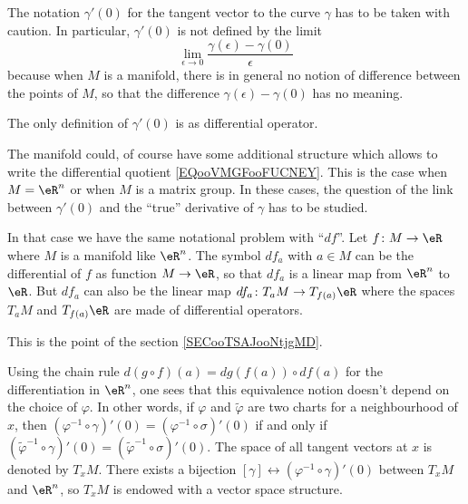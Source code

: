 \begin{remark}      \label{REMooJQFHooQuoZxt}
    The notation \( \gamma'(0)\) for the tangent vector to the curve \( \gamma\) has to be taken with caution. In particular, \( \gamma'(0)\) is not defined by the limit
    \begin{equation}        \label{EQooVMGFooFUCNEY}
        \lim_{\epsilon\to 0} \frac{ \gamma(\epsilon)-\gamma(0) }{ \epsilon }
    \end{equation}
    because when \( M\) is a manifold, there is in general no notion of difference between the points of \( M\), so that the difference \( \gamma(\epsilon)-\gamma(0)\) has no meaning.

    The only definition of \( \gamma'(0)\) is as differential operator.

    The manifold could, of course have some additional structure which allows to write the differential quotient \eqref{EQooVMGFooFUCNEY}. This is the case when \( M=\eR^n\) or when \( M\) is a matrix group. In these cases, the question of the link between \( \gamma'(0)\) and the ``true'' derivative of \( \gamma\) has to be studied.

    In that case we have the same notational problem with ``$df$''. Let \( f\colon M\to \eR\) where \( M\) is a manifold like \( \eR^n\). The symbol \( df_a\) with \( a\in M\) can be the differential of \( f\) as function \( M\to \eR\), so that \( df_a\) is a linear map from \( \eR^n\) to \( \eR\). But \( df_a\) can also be the linear map \( df_a\colon T_aM\to T_{f(a)}\eR\) where the spaces \( T_aM\) and \( T_{f(a)}\eR\) are made of differential operators.

    This is the point of the section \ref{SECooTSAJooNtjgMD}.
\end{remark}

Using the chain rule $d(g\circ f)(a)=dg(f(a))\circ df(a)$ for the differentiation in $\eR^n$, one sees that this equivalence notion doesn't depend on the choice of $\varphi$. In other words, if $\varphi$ and $\tilde{\varphi}$ are two charts for a neighbourhood of $x$, then $(\varphi^{-1} \circ\gamma)'(0)=(\varphi^{-1} \circ\sigma)'(0)$ if and only if $(\tilde{\varphi}^{-1} \circ\gamma)'(0)=(\tilde{\varphi}^{-1} \circ\sigma)'(0)$. The space of all tangent vectors at $x$ is denoted by $T_xM$. There exists a bijection $[\gamma]\leftrightarrow (\varphi^{-1}\circ\gamma)'(0)$ between $T_xM$ and $\eR^n$, so $T_xM$ is endowed with a vector space structure.

